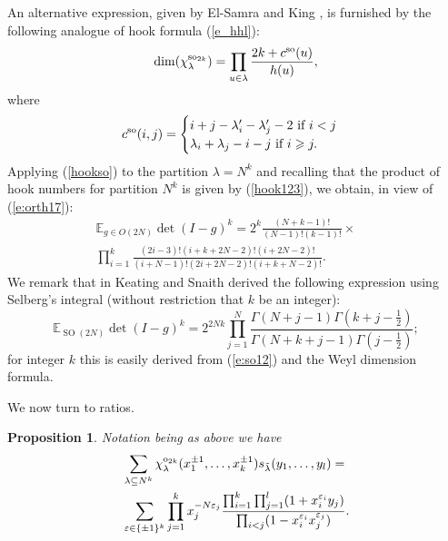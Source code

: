 \documentclass[11pt]{amsart}
\newcommand{\tmop}[1]{\ensuremath{\operatorname{#1}}}
\newtheorem{proposition}{Proposition}
\newcommand{\so}{{\rm so}}
\renewcommand{\o}{{\rm o}}
\begin{document}
An alternative expression, given by El-Samra and King {\cite{EK}},
is furnished by the following analogue of hook formula
(\ref{e_hhl}):
\begin{equation} \label{hookso}
\dim(\chi_{\lambda}^{\so_{2k}})=\prod_{u \in
\lambda}\frac{2k+c^{\so}(u)}{h(u)},
\end{equation}
where
\begin{equation*}
c^{\so}(i, j)=\begin{cases} i+j -\lambda'_i -\lambda'_j -2 \, \,
\text{if}\, \,  i < j \\
\lambda_i +\lambda_j -i-j \, \, \text{if} \, \, i \geqslant j.
\end{cases}
\end{equation*}
Applying (\ref{hookso}) to the partition $\lambda = N^k$ and
recalling that the product of hook numbers for partition $N^k$ is
given by (\ref{hook123}), we obtain, in view of (\ref{e:orth17}):
\begin{eqnarray*}
  \mathbb{E}_{g \in O ( 2 N )} \det ( I - g )^k = 2^k \frac{( N + k - 1 ) !}{(
  N - 1 ) ! ( k - 1 ) !} \times &  & \\
  \prod_{i = 1}^k \frac{( 2 i - 3 ) ! ( i + k + 2 N - 2 ) ! ( i + 2 N - 2 )
  !}{( i + N - 1 ) ! ( 2 i + 2 N - 2 ) ! ( i + k + N - 2 ) !} . &  &
\end{eqnarray*}
We remark that in {\cite{KS00}} Keating and Snaith derived the
following expression using Selberg's integral (without restriction
that $k$ be an integer):
\begin{equation}
  \label{kssotwo} \mathbb{E}_{\tmop{SO} ( 2 N )} \det ( I - g )^k = 2^{2 Nk}
  \prod_{j = 1}^N \frac{\Gamma ( N + j - 1 ) \Gamma ( k + j - \frac{1}{2}
  )}{\Gamma ( N + k + j - 1 ) \Gamma ( j - \frac{1}{2} )} ;
\end{equation}
for integer $k$ this is easily derived from (\ref{e:so12}) and the
Weyl dimension formula.

We now turn to ratios.

\begin{proposition}
  \label{prop:altso}Notation being as above we have
  \begin{equation} \label{e:altso1}
\begin{aligned}
&\sum_{\lambda \subseteq N^{k}}
\chi_{\lambda}^{\o_{2k}}(x_{1}^{\pm 1}, \dots, x_{k}^{\pm 1})
s_{\tilde{\lambda}}(y_1, \dots, y_l) = \\
& \sum_{\varepsilon\in\{\pm 1\}^k}
\prod_{j=1}^{k}x_j^{-N\varepsilon_j}\frac{\prod_{i=1}^{k}\prod_{j=1}^{l}(1+x_i^{\varepsilon_i}y_j)}
{\prod_{i < j}(1-x_i^{\varepsilon_i}x_j^{\varepsilon_j})}.
\end{aligned}
\end{equation}
\end{proposition}
\end{document}
